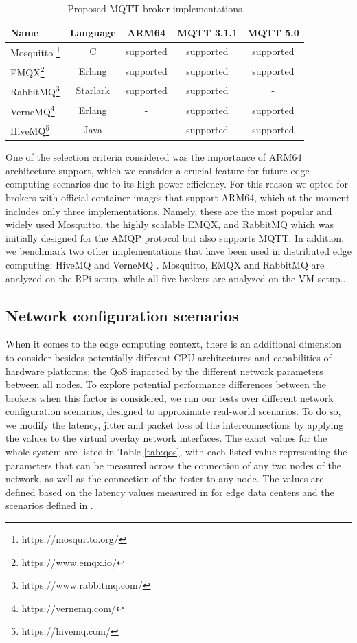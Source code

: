 \documentclass[conference]{IEEEtran}
\begin{document}
\begin{table}[htbp]
    \centering
    \caption{Proposed MQTT broker implementations}
    \label{tab:brokers}
    \begin{tabular}{lcccc}
        \toprule
        \textbf{Name} & \textbf{Language} & \textbf{ARM64} & \textbf{MQTT 3.1.1} & \textbf{MQTT 5.0} \\
        \midrule
        Mosquitto \footnote{https://mosquitto.org/} & C & supported & supported & supported \\
        EMQX\footnote{https://www.emqx.io/} & Erlang & supported & supported & supported \\
        RabbitMQ\footnote{https://www.rabbitmq.com/} & Starlark & supported & supported & - \\
        VerneMQ\footnote{https://vernemq.com/} & Erlang & - & supported & supported \\
        HiveMQ\footnote{https://hivemq.com/} & Java & - & supported & supported \\
        \bottomrule
    \end{tabular}
\end{table}

One of the selection criteria considered was the importance of ARM64 architecture support, which we
consider a crucial feature for future edge computing scenarios due to its high power efficiency.
For this reason we opted for brokers with official container images that support ARM64, which at the
moment includes only three implementations. Namely, these are the most popular and widely used
Mosquitto, the highly scalable EMQX, and RabbitMQ which was initially designed for the AMQP protocol
but also supports MQTT. In addition, we benchmark two other implementations that have been used in
distributed edge computing; HiveMQ and VerneMQ \cite{koziolek2020comparison}. Mosquitto, EMQX  and
RabbitMQ are analyzed on the RPi setup, while all five brokers are analyzed on the VM setup..

\subsection{Network configuration scenarios}

When it comes to the edge computing context, there is an additional dimension to consider besides potentially different CPU architectures and capabilities of hardware platforms; the QoS impacted by the different network parameters between all nodes. To explore potential performance differences between the brokers when this factor is considered, we run our tests over different network configuration scenarios, designed to approximate real-world scenarios. To do so, we
modify the latency, jitter and packet loss of the interconnections by applying the values to the
virtual overlay network interfaces.
The exact values for the whole system are listed in Table
\ref{tab:qos}, with each listed value representing the parameters that can be measured across the connection of any two nodes of the network, as well as the connection of the tester to any node. The values are defined based on the latency values measured in \cite{charyyev2020latency} for edge data centers and the scenarios defined in \cite{carpio2022benchfaas}.
\end{document}

